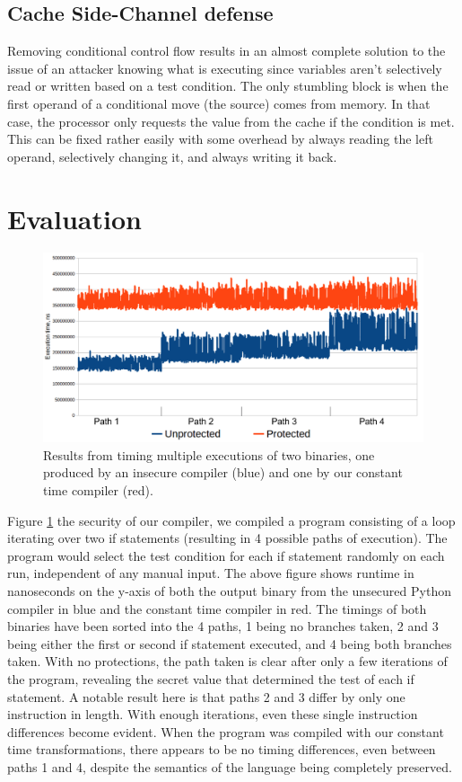 \documentclass[sigplan, review]{acmart}
\begin{document}
\subsection{Cache Side-Channel defense}
Removing conditional control flow results in an almost complete solution to the issue of an attacker knowing what is executing since variables aren’t selectively read or written based on a test condition. The only stumbling block is when the first operand of a conditional move (the source) comes from memory. In that case, the processor only requests the value from the cache if the condition is met. This can be fixed rather easily with some overhead by always reading the left operand, selectively changing it, and always writing it back.

\section{Evaluation}

\begin{figure}[tp]
\includegraphics[width=\textwidth]{./timings_protected_vs_unprotected.png}
\caption{Results from timing multiple executions of two binaries, one produced by an insecure compiler (blue) and one by our constant time compiler (red).}
\label{fig:timings}
\end{figure}

Figure \ref{fig:timings} the security of our compiler, we compiled a program consisting of a loop iterating over two if statements (resulting in 4 possible paths of execution). The program would select the test condition for each if statement randomly on each run, independent of any manual input. The above figure shows runtime in nanoseconds on the y-axis of both the output binary from the unsecured Python compiler in blue and the constant time compiler in red. The timings of both binaries have been sorted into the 4 paths, 1 being no branches taken, 2 and 3 being either the first or second if statement executed, and 4 being both branches taken. With no protections, the path taken is clear after only a few iterations of the program, revealing the secret value that determined the test of each if statement. A notable result here is that paths 2 and 3 differ by only one instruction in length. With enough iterations, even these single instruction differences become evident. When the program was compiled with our constant time transformations, there appears to be no timing differences, even between paths 1 and 4, despite the semantics of the language being completely preserved.
\end{document}
